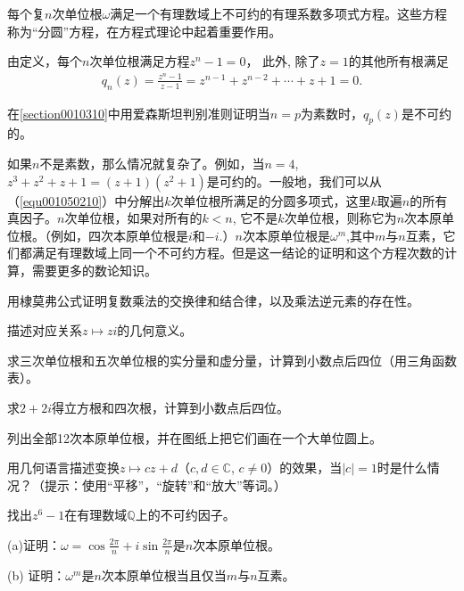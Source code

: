 每个复$n$次单位根$\omega$满足一个有理数域上不可约的有理系数多项式方程。这些方程称为“分圆”方程，在方程式理论中起着重要作用。

由定义，每个$n$次单位根满足方程$z^n-1=0$， 此外, 除了$z=1$的其他所有根满足
\begin{gather}\label{equ001050210}
q_n(z) = \frac{z^n-1}{z-1} = z^{n-1} + z^{n-2} + \cdots + z + 1 = 0.
\end{gather}

在\ref{section0010310}中用爱森斯坦判别准则证明当$n=p$为素数时，$q_p(z)$是不可约的。

如果$n$不是素数，那么情况就复杂了。例如，当$n=4$, $z^3+z^2+z+1=(z+1)(z^2+1)$是可约的。一般地，我们可以从（\ref{equ001050210}）中分解出$k$次单位根所满足的分圆多项式，这里$k$取遍$n$的所有真因子。$n$次单位根，如果对所有的$k<n$, 它不是$k$次单位根，则称它为$n$次本原单位根。（例如，四次本原单位根是$i$和$-i$.）$n$次本原单位根是$\omega^m$,其中$m$与$n$互素，它们都满足有理数域上同一个不可约方程。但是这一结论的证明和这个方程次数的计算，需要更多的数论知识。

\begin{problemset}
\item 用棣莫弗公式证明复数乘法的交换律和结合律，以及乘法逆元素的存在性。

\item 描述对应关系$z \mapsto zi$的几何意义。

\item 求三次单位根和五次单位根的实分量和虚分量，计算到小数点后四位（用三角函数表）。

\item 求$2+2i$得立方根和四次根，计算到小数点后四位。

\item 列出全部12次本原单位根，并在图纸上把它们画在一个大单位圆上。

\item 用几何语言描述变换$z \mapsto cz+d$（$c, d \in \mathbb{C}$, $c \neq 0$）的效果，当$|c|=1$时是什么情况？（提示：使用“平移”，“旋转”和“放大”等词。）

\item 找出$z^6-1$在有理数域$\mathbb{Q}$上的不可约因子。

\item (a)证明：$\omega = \cos{\frac{2\pi}{n}} + i\sin{\frac{2\pi}{n}}$是$n$次本原单位根。

(b) 证明：$\omega^m$是$n$次本原单位根当且仅当$m$与$n$互素。
\end{problemset}



